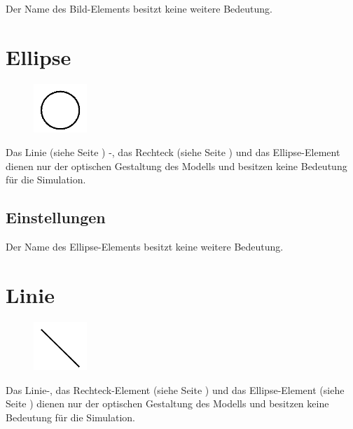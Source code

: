 Der Name des Bild-Elements besitzt keine weitere Bedeutung.


\section{Ellipse}
\label{ref:ModelElementEllipse}

\begin{figure}
\vspace{-22pt}
\includegraphics[width=2cm]{imageModelElementEllipse.png}
\vspace{-22pt}
\end{figure}

Das Linie (siehe Seite \pageref{ref:ModelElementLine}) -, das Rechteck (siehe Seite \pageref{ref:ModelElementRectangle}) 
und das Ellipse-Element dienen nur der optischen Gestaltung des Modells und besitzen keine Bedeutung für die Simulation.

\subsection*{Einstellungen}

Der Name des Ellipse-Elements besitzt keine weitere Bedeutung.


\section{Linie}
\label{ref:ModelElementLine}

\begin{figure}
\vspace{-22pt}
\includegraphics[width=2cm]{imageModelElementLine.png}
\vspace{-22pt}
\end{figure}

Das Linie-, das Rechteck-Element (siehe Seite \pageref{ref:ModelElementRectangle}) und das
Ellipse-Element (siehe Seite \pageref{ref:ModelElementEllipse}) dienen nur der optischen Gestaltung
des Modells und besitzen keine Bedeutung für die Simulation.

